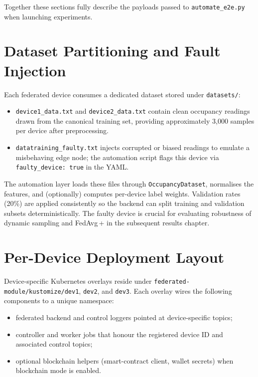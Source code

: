 Together these sections fully describe the payloads passed to \texttt{automate\_e2e.py} when launching experiments.

\section{Dataset Partitioning and Fault Injection}
\label{sec:dataset_partitioning}

Each federated device consumes a dedicated dataset stored under \texttt{datasets/}:

\begin{itemize}
    \item \texttt{device1\_data.txt} and \texttt{device2\_data.txt} contain clean occupancy readings drawn from the canonical training set, providing approximately 3{,}000 samples per device after preprocessing.
    \item \texttt{datatraining\_faulty.txt} injects corrupted or biased readings to emulate a misbehaving edge node; the automation script flags this device via \texttt{faulty\_device: true} in the YAML.
\end{itemize}

The automation layer loads these files through \texttt{OccupancyDataset}, normalises the features, and (optionally) computes per-device label weights. Validation rates (20\%) are applied consistently so the backend can split training and validation subsets deterministically. The faulty device is crucial for evaluating robustness of dynamic sampling and FedAvg\,+ in the subsequent results chapter.

\section{Per-Device Deployment Layout}
\label{sec:deployment_layout}

Device-specific Kubernetes overlays reside under \texttt{federated-module/kustomize/dev1}, \texttt{dev2}, and \texttt{dev3}. Each overlay wires the following components to a unique namespace:

\begin{itemize}
    \item federated backend and control loggers pointed at device-specific topics;
    \item controller and worker jobs that honour the registered device ID and associated control topics;
    \item optional blockchain helpers (smart-contract client, wallet secrets) when blockchain mode is enabled.
\end{itemize}

